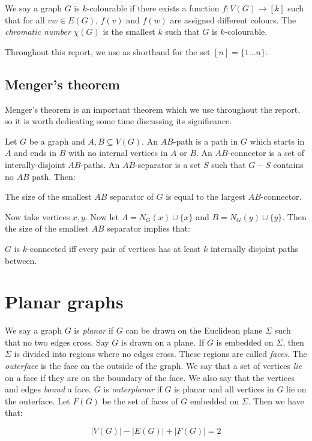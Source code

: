 We say a graph $G$ is $k$-colourable if there exists a function $f: V(G) \rightarrow [k]$ such that for all $vw \in E(G)$, $f(v)$ and $f(w)$ are assigned different colours. The \textit{chromatic number} $\chi(G)$ is the smallest $k$ such that $G$ is $k$-colourable. 

Throughout this report, we use as shorthand for the set $[n] = \lbrace 1... n \rbrace$. 

\subsection{Menger's theorem}
Menger's theorem is an important theorem which we use throughout the report, so it is worth dedicating some time discussing its significance.

Let $G$ be a graph and $A, B \subseteq V(G)$. An $AB$-path is a path in $G$ which starts in $A$ and ends in $B$ with no internal vertices in $A$ or $B$. An $AB$-connector is a set of interally-disjoint $AB$-paths. An $AB$-separator is a set $S$ such that $G - S$ contains no $AB$ path. Then:

\begin{theorem}
	\label{thm:Menger}
	The size of the smallest $AB$ separator of $G$ is equal to the largest $AB$-connector. 
\end{theorem}

Now take vertices $x, y$. Now let $A = N_G(x) \cup \{x\}$ and $B = N_G(y) \cup \{y\}$. Then the size of the smallest $AB$ separator implies that:
\begin{theorem}
	\label{thm:Menger_Vertex}
	$G$ is $k$-connected iff every pair of vertices has at least $k$ internally disjoint paths between. 
\end{theorem}

\section{Planar graphs}\label{sec:Planar graphs}
We say a graph $G$ is \textit{planar} if $G$ can be drawn on the Euclidean plane $\Sigma$ such that no two edges cross. Say $G$ is drawn on a plane. If $G$ is embedded on $\Sigma$, then $\Sigma$ is divided into regions where no edges cross. These regions are called \textit{faces}. The \textit{outerface} is the face on the outside of the graph. We say that a set of vertices \textit{lie} on a face if they are on the boundary of the face. We also say that the vertices and edges \textit{bound} a face. $G$ is \textit{outerplanar} if $G$ is planar and all vertices in $G$ lie on the outerface. 
Let $F(G)$ be the set of faces of $G$ embedded on $\Sigma$. Then we have that:
\begin{theorem}\label{thm:Euler_planar}
	\begin{equation}
		|V(G)| - |E(G)| + |F(G)| = 2
	\end{equation}
\end{theorem}

